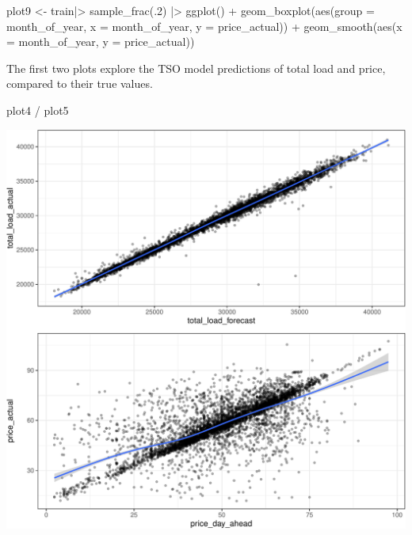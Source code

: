 \documentclass[
]{article}
\newenvironment{Shaded}{\begin{snugshade}}{\end{snugshade}}
\newcommand{\AttributeTok}[1]{\textcolor[rgb]{0.40,0.45,0.13}{#1}}
\newcommand{\DecValTok}[1]{\textcolor[rgb]{0.68,0.00,0.00}{#1}}
\newcommand{\FunctionTok}[1]{\textcolor[rgb]{0.28,0.35,0.67}{#1}}
\newcommand{\NormalTok}[1]{\textcolor[rgb]{0.00,0.23,0.31}{#1}}
\newcommand{\OtherTok}[1]{\textcolor[rgb]{0.00,0.23,0.31}{#1}}
\newcommand{\SpecialCharTok}[1]{\textcolor[rgb]{0.37,0.37,0.37}{#1}}
\begin{document}
\begin{Shaded}
\begin{Highlighting}[]
\NormalTok{plot9 }\OtherTok{\textless{}{-}}\NormalTok{ train}\SpecialCharTok{|\textgreater{}}
  \FunctionTok{sample\_frac}\NormalTok{(.}\DecValTok{2}\NormalTok{) }\SpecialCharTok{|\textgreater{}}
  \FunctionTok{ggplot}\NormalTok{() }\SpecialCharTok{+}
  \FunctionTok{geom\_boxplot}\NormalTok{(}\FunctionTok{aes}\NormalTok{(}\AttributeTok{group =}\NormalTok{ month\_of\_year, }\AttributeTok{x =}\NormalTok{ month\_of\_year, }\AttributeTok{y =}\NormalTok{ price\_actual)) }\SpecialCharTok{+}
  \FunctionTok{geom\_smooth}\NormalTok{(}\FunctionTok{aes}\NormalTok{(}\AttributeTok{x =}\NormalTok{ month\_of\_year, }\AttributeTok{y =}\NormalTok{ price\_actual))}
\end{Highlighting}
\end{Shaded}

The first two plots explore the TSO model predictions of total load and
price, compared to their true values.

\begin{Shaded}
\begin{Highlighting}[]
\NormalTok{plot4 }\SpecialCharTok{/}\NormalTok{ plot5}
\end{Highlighting}
\end{Shaded}

\includegraphics{Analytics_Report_files/figure-pdf/plot45-1.pdf}
\end{document}
